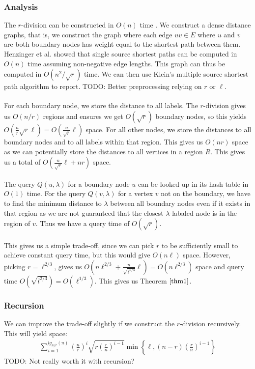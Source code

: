 \subsubsection{Analysis}
The $r$-division can be constructed in $O(n)$ time \cite{klein2013structured}. We
construct a dense distance graphs, that is, we construct the graph where each edge $uv\in
E$ where $u$ and $v$ are both boundary nodes has weight equal to the shortest path
between them. Henzinger et al. showed that single source shortest paths can be computed
in $O(n)$ time \cite{henzinger1997faster} assuming non-negative edge lengths. This graph
can thus be computed in $O(n^2/\sqrt{r})$ time. We can then use Klein's multiple source
shortest path algorithm \cite{klein2005multiple} to report. TODO: Better preprocessing relying on $r$ or $\ell$. \\
\\
For each boundary node, we store the distance to all labels. The $r$-division gives us
$O(n/r)$ regions and ensures we
get $O(\sqrt{r})$ boundary nodes, so this yields
$O(\frac{n}{r}\sqrt{r}\ell)=O(\frac{n}{\sqrt{r}}\ell)$ space. For all other nodes, we
store the distances to all boundary nodes and to all labels within that region. This
gives us $O(nr)$ space as we can potentially store the distances to all vertices in a
region $R$. This gives us a total of $O(\frac{n}{\sqrt{r}}\ell+nr)$ space. \\
\\
The query $Q(u,\lambda)$ for a boundary node $u$ can be looked up in its hash table in
$O(1)$ time. For the query $Q(v,\lambda)$ for a vertex $v$ not on the boundary, we have
to find the minimum distance to $\lambda$ between all boundary nodes even if it exists in
that region as we are not guaranteed that the closest $\lambda$-labaled node is in the
region of $v$. Thus we have a query time of $O(\sqrt{r})$. \\
\\
This gives us a simple trade-off, since we can pick $r$ to be sufficiently small to
achieve constant query time, but this would give $O(n\ell)$ space. However, picking
$r=\ell^{2/3}$, gives us $O(n\ell^{2/3}+\frac{n}{\sqrt{\ell^{2/3}}}\ell)=O(n\ell^{2/3})$
space and query time $O(\sqrt{l^{2/3}})=O(\ell^{1/3})$. This gives us Theorem
$\ref{thm1}$.

\subsubsection{Recursion}
We can improve the trade-off slightly if we construct the $r$-division recursively. This will
yield space:
\begin{align*}
  \sum_{i=1}^{lg_{n/r}(n)} \left(\frac{n}{r}\right)^i
  \sqrt{r\left(\frac{r}{n}\right)^{i-1}} \min
  \left\{\ell,\left(n-r\right)\left(\frac{r}{n}\right)^{i-1}\right\}
\end{align*}
TODO: Not really worth it with recursion?

